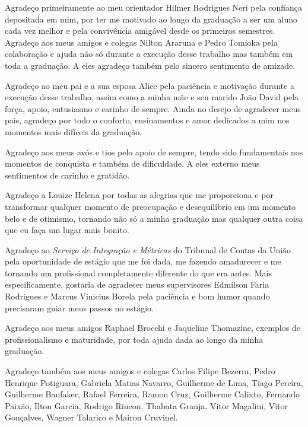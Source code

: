 \begin{agradecimentos}

Agradeço primeiramente ao meu orientador Hilmer Rodrigues Neri pela confiança depositada em mim, por ter me motivado ao longo da graduação a ser um aluno cada vez melhor e pela convivência amigável desde os primeiros semestres. Agradeço aos meus amigos e colegas Nilton Araruna e Pedro Tomioka pela colaboração e ajuda não só durante a execução desse trabalho mas também em toda a graduação. A eles agradeço também pelo sincero sentimento de amizade.

Agradeço ao meu pai e a sua esposa Alice pela paciência e motivação durante a execução desse trabalho, assim como a minha mãe e seu marido João David pela força, apoio, entusiasmo e carinho de sempre. Ainda no desejo de agradecer meus pais, agradeço por todo o conforto, ensinamentos e amor dedicados a mim nos momentos mais difíceis da graduação.

Agradeço aos meus avós e tios pelo apoio de sempre, tendo sido fundamentais nos momentos de conquista e também de dificuldade. A eles externo meus sentimentos de carinho e gratidão.

Agradeço a Louize Helena por todas as alegrias que me proporciona e por transformar qualquer momento de preocupação e desequilíbrio em um momento belo e de otimismo, tornando não só a minha graduação mas qualquer outra coisa que eu faça um lugar mais bonito. 

Agradeço ao \textit{Serviço de Integração e Métricas} do Tribunal de Contas da União pela oportunidade de estágio que me foi dada, me fazendo amadurecer e me tornando um profissional completamente diferente do que era antes. Mais especificamente, gostaria de agradecer meus supervisores Edmilson Faria Rodrigues e Marcus Vinicius Borela pela paciência e bom humor quando precisaram guiar meus passos no estágio.

Agradeço aos meus amigos Raphael Brocchi e Jaqueline Thomazine, exemplos de profissionalismo e maturidade, por toda ajuda dada ao longo da minha graduação. 

Agradeço também aos meus amigos e colegas Carlos Filipe Bezerra, Pedro Henrique Potiguara, Gabriela Matias Navarro, Guilherme de Lima, Tiago Pereira, Guilherme Baufaker, Rafael Ferreira, Ramon Cruz, Guilherme Calixto, Fernando Paixão, Ilton Garcia, Rodrigo Rincon, Thabata Granja, Vitor Magalini, Vitor Gonçalves, Wagner Talarico e Mairon Cruvinel. 


\end{agradecimentos}
